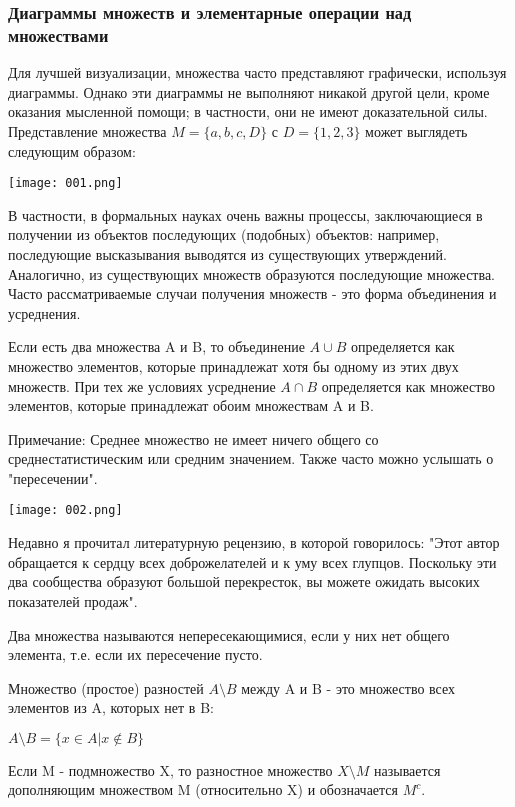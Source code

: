 \subsubsection{Диаграммы множеств и элементарные операции над множествами}
Для лучшей визуализации, множества часто представляют графически, используя диаграммы.
Однако эти диаграммы не выполняют никакой другой цели, кроме оказания мысленной помощи;
в частности, они не имеют доказательной силы. Представление множества \(M = \{a, b, c, D\}\) с \(D=\{1, 2, 3\}\) может выглядеть следующим образом:
\begin{center}
  \texttt{[image: 001.png]}
\end{center}
В частности, в формальных науках очень важны процессы, заключающиеся в получении из объектов последующих (подобных) объектов: например, последующие высказывания выводятся из существующих утверждений.
Аналогично, из существующих множеств образуются последующие множества.
Часто рассматриваемые случаи получения множеств - это форма объединения и усреднения.

Если есть два множества A и B, то объединение \(A \cup B\) определяется как множество элементов, которые принадлежат хотя бы одному из этих двух множеств.
При тех же условиях усреднение \(A \cap B\) определяется как множество элементов, которые принадлежат обоим множествам A и B.

Примечание: Среднее множество не имеет ничего общего со среднестатистическим или средним значением.
Также часто можно услышать о "пересечении".
\begin{center}
  \texttt{[image: 002.png]}
\end{center}
Недавно я прочитал литературную рецензию, в которой говорилось: "Этот автор обращается к сердцу всех доброжелателей и к уму всех глупцов.
Поскольку эти два сообщества образуют большой перекресток, вы можете ожидать высоких показателей продаж".

Два множества называются непересекающимися, если у них нет общего элемента, т.е. если их пересечение пусто.

Множество (простое) разностей \(A \setminus B\) между A и B - это множество всех элементов из A, которых нет в B:

\vspace{0.5cm}
\(A \setminus B = \{x \in A | x \notin B\}\)

\vspace{0.5cm}
Если M - подмножество X, то разностное множество \(X \setminus M\) называется дополняющим множеством M (относительно X) и обозначается \(M^c\).

